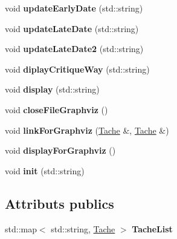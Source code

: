 \begin{DoxyCompactItemize}
\item 
\hypertarget{class_diagramme_aa43a5bc79bd7f91070b4b7c39a395b9c}{void {\bfseries update\-Early\-Date} (std\-::string)}\label{class_diagramme_aa43a5bc79bd7f91070b4b7c39a395b9c}

\item 
\hypertarget{class_diagramme_a6b7918a1aec61cf8465fac4eeec01e00}{void {\bfseries update\-Late\-Date} (std\-::string)}\label{class_diagramme_a6b7918a1aec61cf8465fac4eeec01e00}

\item 
\hypertarget{class_diagramme_a6c6fd5f520a069938b30cbefe8d7f740}{void {\bfseries update\-Late\-Date2} (std\-::string)}\label{class_diagramme_a6c6fd5f520a069938b30cbefe8d7f740}

\item 
\hypertarget{class_diagramme_ae71fd18aad40e6695ccb7421164486aa}{void {\bfseries diplay\-Critique\-Way} (std\-::string)}\label{class_diagramme_ae71fd18aad40e6695ccb7421164486aa}

\item 
\hypertarget{class_diagramme_a6586acf2cbd668b29983d73afb896922}{void {\bfseries display} (std\-::string)}\label{class_diagramme_a6586acf2cbd668b29983d73afb896922}

\item 
\hypertarget{class_diagramme_ab3699b38f08275f6f74cdad55b93e6fe}{void {\bfseries close\-File\-Graphviz} ()}\label{class_diagramme_ab3699b38f08275f6f74cdad55b93e6fe}

\item 
\hypertarget{class_diagramme_a5db905aa8484d85e9f1e73baaf32f919}{void {\bfseries link\-For\-Graphviz} (\hyperlink{class_tache}{Tache} \&, \hyperlink{class_tache}{Tache} \&)}\label{class_diagramme_a5db905aa8484d85e9f1e73baaf32f919}

\item 
\hypertarget{class_diagramme_a39db56fd82cebc6981c6b73f16fb19e2}{void {\bfseries display\-For\-Graphviz} ()}\label{class_diagramme_a39db56fd82cebc6981c6b73f16fb19e2}

\item 
\hypertarget{class_diagramme_ad132990766f83df6b49cbd31c271f5ba}{void {\bfseries init} (std\-::string)}\label{class_diagramme_ad132990766f83df6b49cbd31c271f5ba}

\end{DoxyCompactItemize}
\subsection*{Attributs publics}
\begin{DoxyCompactItemize}
\item 
\hypertarget{class_diagramme_a4c34785e515807602218c4dbaf093746}{std\-::map$<$ std\-::string, \hyperlink{class_tache}{Tache} $>$ {\bfseries Tache\-List}}\label{class_diagramme_a4c34785e515807602218c4dbaf093746}

\end{DoxyCompactItemize}


